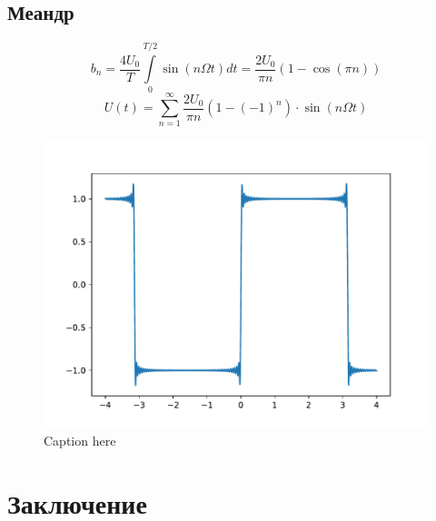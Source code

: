 \subsection{Меандр}
\begin{equation}
	b_n=\frac{4U_0}{T}\int\limits_{0}^{T/2} \sin(n\Omega t)dt=\frac{2U_0}{\pi n}(1-\cos(\pi n))
\end{equation}
\begin{equation}
	U(t)=\sum_{n=1}^{\infty}\frac{2U_0}{\pi n}(1-(-1)^n)\cdot\sin(n\Omega t)
\end{equation}
\begin{figure}[tb]
	\centering
	\includegraphics[]{plot/meandr}
	\caption{Caption here}
	\label{fig:figure1}
\end{figure}

\newpage
\section{Заключение}

